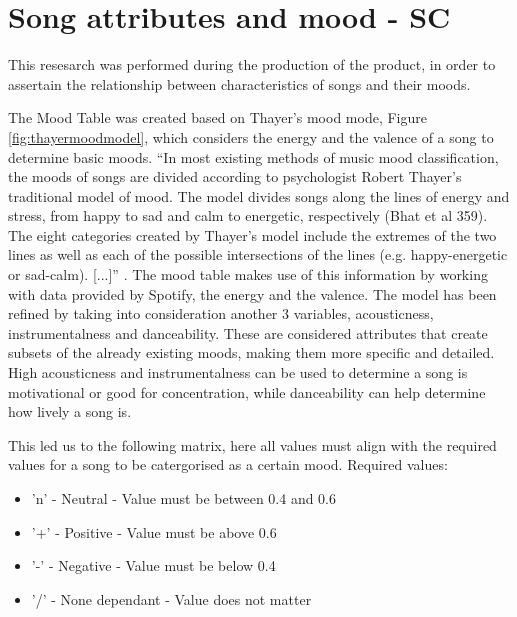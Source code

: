 \documentclass[11pt]{report}
\begin{document}
\section{Song attributes and mood - SC}

This resesarch was performed during the production of the product, in order to assertain the relationship between characteristics of songs and their moods.\newline

The Mood Table was created based on Thayer’s mood mode, Figure \ref{fig:thayermoodmodel}, which considers the energy and the valence of a song to determine basic moods. “In most existing methods of music mood classification, the moods of songs are divided according to psychologist Robert Thayer’s traditional model of mood. The model divides songs along the lines of energy and stress, from happy to sad and calm to energetic, respectively (Bhat et al 359). The eight categories created by Thayer’s model include the extremes of the two lines as well as each of the possible intersections of the lines (e.g. happy-energetic or sad-calm). [...]” \cite{Nuzzolo2015}. The mood table makes use of this information by working with data provided by Spotify, the energy and the valence. The model has been refined by taking into consideration another 3 variables, acousticness, instrumentalness and danceability. These are considered attributes that create subsets of the already existing moods, making them more specific and detailed. High acousticness and instrumentalness can be used to determine a song is motivational or good for concentration, while danceability can help determine how lively a song is. 

This led us to the following matrix, here all values must align with the required values for a song to be catergorised as a certain mood.
Required values:
\begin{itemize}
\item 'n' - Neutral - Value must be between 0.4 and 0.6
\item '+' - Positive - Value must be above 0.6
\item '-' - Negative - Value must be below 0.4
\item '/' - None dependant - Value does not matter
\end{itemize} 
\end{document}
